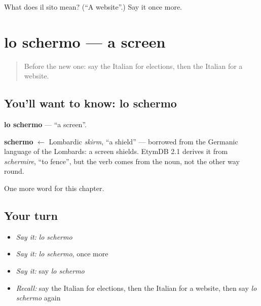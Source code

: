 \begin{tcolorbox}[breakable,colback=teal!4,colframe=teal!35!black,title={Before you move on}]
What does il sito mean? (\textquotedblleft{}A website\textquotedblright{}.) Say it once more.
\end{tcolorbox}
\section[lo schermo]{lo schermo — a screen}

\label{lesson:IT-C162-schermo}



\begin{quote}
Before the new one: say the Italian for elections, then the Italian for a website.
\end{quote}

\subsection*{You'll want to know: lo schermo}
\textbf{lo schermo} — \textquotedblleft{}a screen\textquotedblright{}.

\begin{cousinweb}
\textbf{schermo} $\leftarrow$ Lombardic \emph{skirm}, \textquotedblleft{}a shield\textquotedblright{} — borrowed from the Germanic language of the Lombards: a screen shields. EtymDB 2.1 derives it from \emph{schermire}, \textquotedblleft{}to fence\textquotedblright{}, but the verb comes from the noun, not the other way round.
\end{cousinweb}

\begin{grammarlens}[title={What you've built}]
One more word for this chapter.
\end{grammarlens}

\subsection*{Your turn}
\begin{itemize}
\raggedright
  \item \emph{Say it:} \emph{lo schermo}
  \item \emph{Say it:} \emph{lo schermo}, once more
  \item \emph{Say it:} say \emph{lo schermo}
  \item \emph{Recall:} say the Italian for elections, then the Italian for a website, then say \emph{lo schermo} again
\end{itemize}

